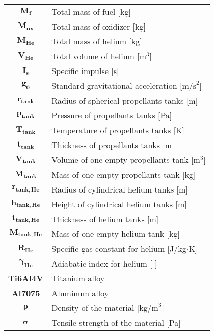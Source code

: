 \begin{multicols}{2}
{\begin{xltabular}{\linewidth}{c>{\raggedright\arraybackslash}X}
		$\boldsymbol{M_f}$ & Total mass of fuel [kg] \\
		$\boldsymbol{M_{ox}}$ & Total mass of oxidizer [kg] \\
		$\boldsymbol{M_{He}}$ & Total mass of helium [kg] \\
		$\boldsymbol{V_{He}}$ & Total volume of helium [$\textrm{m}^3$] \\
		$\boldsymbol{I_s}$ & Specific impulse [s] \\
		$\boldsymbol{g_0}$ & Standard gravitational acceleration [$\textrm{m/s}^2$] \\
		$\boldsymbol{r_{tank}}$ & Radius of spherical propellants tanks [m] \\
		$\boldsymbol{p_{tank}}$ & Pressure of propellants tanks [Pa] \\
		$\boldsymbol{T_{tank}}$ & Temperature of propellants tanks [K] \\
		$\boldsymbol{t_{tank}}$ & Thickness of propellants tanks [m] \\
		$\boldsymbol{V_{tank}}$ & Volume of one empty propellants tank [$\textrm{m}^3$] \\
		$\boldsymbol{M_{tank}}$ & Mass of one empty propellants tank [kg] \\
		$\boldsymbol{r_{tank,He}}$ & Radius of cylindrical helium tanks [m] \\
		$\boldsymbol{h_{tank,He}}$ & Height of cylindrical helium tanks [m] \\
		$\boldsymbol{t_{tank,He}}$ & Thickness of helium tanks [m] \\
		$\boldsymbol{M_{tank,He}}$ & Mass of one empty helium tank [kg] \\
		$\boldsymbol{R_{He}}$ & Specific gas constant for helium [J/kg$\cdot$K] \\
		$\boldsymbol{\gamma_{He}}$ & Adiabatic index for helium [-] \\
		\textbf{Ti6Al4V} & Titanium alloy \\
		\textbf{Al7075} & Aluminum alloy \\
		$\boldsymbol{\rho}$ & Density of the material [$\textrm{kg/m}^3$] \\
		$\boldsymbol{\sigma}$ & Tensile strength of the material [Pa] 
	\end{xltabular}
	\unskip
	\unpenalty
	\unpenalty}
	\unvbox\ltmcbox
\end{multicols}